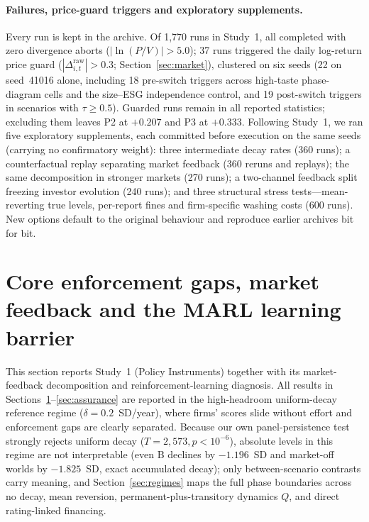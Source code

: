 \documentclass[11pt]{article}
\begin{document}
\paragraph{Failures, price-guard triggers and exploratory supplements.} Every run is kept in the archive. Of 1,770 runs in Study~1, all completed with zero divergence aborts ($|\ln(P/V)| > 5.0$); 37 runs triggered the daily log-return price guard ($|\Delta^{\mathrm{raw}}_{i,t}| > 0.3$; Section~\ref{sec:market}), clustered on six seeds (22 on seed~41016 alone, including 18 pre-switch triggers across high-taste phase-diagram cells and the size--ESG independence control, and 19 post-switch triggers in scenarios with $\tau \ge 0.5$). Guarded runs remain in all reported statistics; excluding them leaves P2 at $+0.207$ and P3 at $+0.333$. Following Study~1, we ran five exploratory supplements, each committed before execution on the same seeds (carrying no confirmatory weight): three intermediate decay rates (360 runs); a counterfactual replay separating market feedback (360 reruns and replays); the same decomposition in stronger markets (270 runs); a two-channel feedback split freezing investor evolution (240 runs); and three structural stress tests---mean-reverting true levels, per-report fines and firm-specific washing costs (600 runs). New options default to the original behaviour and reproduce earlier archives bit for bit.

\section{Core enforcement gaps, market feedback and the MARL learning barrier}\label{sec:results}

This section reports Study~1 (Policy Instruments) together with its market-feedback decomposition and reinforcement-learning diagnosis. All results in Sections~\ref{sec:results}--\ref{sec:assurance} are reported in the high-headroom uniform-decay reference regime ($\delta = 0.2$~SD/year), where firms' scores slide without effort and enforcement gaps are clearly separated. Because our own panel-persistence test strongly rejects uniform decay ($T = 2{,}573, p < 10^{-6}$), absolute levels in this regime are not interpretable (even B declines by $-1.196$~SD and market-off worlds by $-1.825$~SD, exact accumulated decay); only between-scenario contrasts carry meaning, and Section~\ref{sec:regimes} maps the full phase boundaries across no decay, mean reversion, permanent-plus-transitory dynamics $Q$, and direct rating-linked financing.
\end{document}
